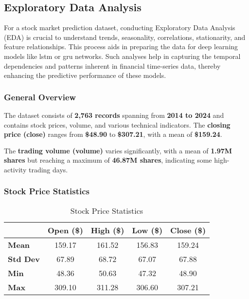 \clearpage
\subsection{Exploratory Data Analysis}
\label{app:eda}

For a stock market prediction dataset, conducting Exploratory Data Analysis (EDA) is crucial
to understand trends, seasonality, correlations, stationarity, and feature relationships. 
This process aids in preparing the data for deep learning models like \acrshort{lstm}
or \acrshort{gru} networks. Such analyses help in capturing the temporal dependencies and
patterns inherent in financial time-series data, thereby enhancing the predictive
performance of these models. 


\subsubsection{General Overview}
The dataset consists of \textbf{2,763 records} spanning from \textbf{2014 to 2024} and 
contains stock prices, volume, and various technical indicators.
The \textbf{closing price (close)} ranges from \textbf{\$48.90} to \textbf{\$307.21}, with
a mean of \textbf{\$159.24}.

The \textbf{trading volume (volume)} varies significantly, with a mean
of \textbf{1.97M shares} but reaching a maximum of \textbf{46.87M shares}, indicating 
some high-activity trading days.

\subsubsection{Stock Price Statistics}

\begin{table}[H]
    \centering
    \caption{Stock Price Statistics}
    \label{tab:stock_price_stats}
    \begin{tabular}{lcccc}
        \hline
        & \textbf{Open (\$)} & \textbf{High (\$)} & \textbf{Low (\$)} & \textbf{Close (\$)} \\
        \hline\hline
        \textbf{Mean} & 159.17 & 161.52 & 156.83 & 159.24 \\
        \textbf{Std Dev} & 67.89 & 68.72 & 67.07 & 67.88 \\
        \textbf{Min} & 48.36 & 50.63 & 47.32 & 48.90 \\
        \textbf{Max} & 309.10 & 311.28 & 306.60 & 307.21 \\
        \hline
    \end{tabular}
\end{table}


